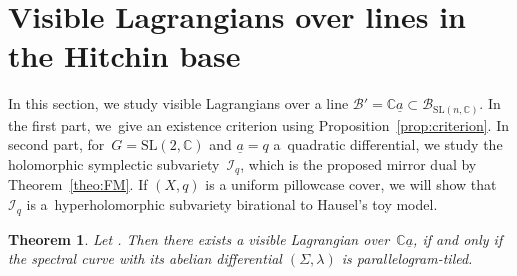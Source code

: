 \documentclass[10pt,a4paper]{amsart}
\numberwithin{equation}{section}
\newtheorem{theo}{Theorem}[section]
\theoremstyle{definition}
\newcommand{\reg}{\mathrm{reg}}
\newcommand{\calB}{\mathcal{B}}
\newcommand{\calI}{\mathcal{I}}
\newcommand{\CC}{\mathbb{C}}
\newcommand{\SL}{\mathrm{SL}}
\begin{document}
\section{Visible Lagrangians over lines in the Hitchin base}

In this section, we study visible Lagrangians over a line $\calB'=\CC \underline{a} \subset \calB_{\SL(n,\CC)}$. In the first part, we~give an existence criterion using Proposition~\ref{prop:criterion}. In second part, for~$G=\SL(2,\CC)$ and $\underline{a}=q$ a~quadratic differential, we study the holomorphic symplectic subvariety~$\calI_q$, which is the proposed mirror dual by Theorem~\ref{theo:FM}. If $(X,q)$ is a uniform pillowcase cover, we will show that~$\calI_q$ is a~hyperholomorphic subvariety birational to Hausel's toy model.


\begin{theo}\label{theo:visi_Lagr_over_line} Let \smash{$\underline{a}=(0,\dots,0,a_n) \in \calB_{\SL(n,\CC)}^\reg$}. Then there exists a visible Lagrangian over~$\CC \underline{a}$, if and only if the spectral curve with its abelian differential $(\Sigma,\lambda)$ is parallelogram-tiled.
\end{theo}
\end{document}
